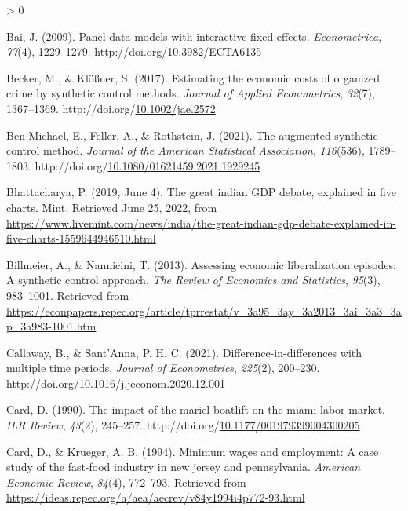 \documentclass[12pt,nobind, a4paper]{reedthesis}
\newlength{\cslhangindent}
\newenvironment{CSLReferences}[2] %
{%
	\setlength{\parindent}{0pt}
	\ifodd #1 \everypar{\setlength{\hangindent}{\cslhangindent}}\ignorespaces\fi
	\ifnum #2 > 0
	\setlength{\parskip}{#2\baselineskip}
	\fi
}%
{}
\begin{document}
\begin{CSLReferences}{1}{0}
 \leavevmode\hypertarget{ref-bai_panel_2009}{}%
 Bai, J. (2009). Panel data models with interactive fixed effects. \emph{Econometrica}, \emph{77}(4), 1229--1279. http://doi.org/\href{https://doi.org/10.3982/ECTA6135}{10.3982/ECTA6135}

 \leavevmode\hypertarget{ref-becker_estimating_2017}{}%
 Becker, M., \& Klößner, S. (2017). Estimating the economic costs of organized crime by synthetic control methods. \emph{Journal of Applied Econometrics}, \emph{32}(7), 1367--1369. http://doi.org/\href{https://doi.org/10.1002/jae.2572}{10.1002/jae.2572}

 \leavevmode\hypertarget{ref-ben-michael_augmented_2021}{}%
 Ben-Michael, E., Feller, A., \& Rothstein, J. (2021). The augmented synthetic control method. \emph{Journal of the American Statistical Association}, \emph{116}(536), 1789--1803. http://doi.org/\href{https://doi.org/10.1080/01621459.2021.1929245}{10.1080/01621459.2021.1929245}

 \leavevmode\hypertarget{ref-bhattacharya_great_2019}{}%
 Bhattacharya, P. (2019, June 4). The great indian {GDP} debate, explained in five charts. Mint. Retrieved June 25, 2022, from \url{https://www.livemint.com/news/india/the-great-indian-gdp-debate-explained-in-five-charts-1559644946510.html}

 \leavevmode\hypertarget{ref-billmeier_assessing_2013}{}%
 Billmeier, A., \& Nannicini, T. (2013). Assessing economic liberalization episodes: A synthetic control approach. \emph{The Review of Economics and Statistics}, \emph{95}(3), 983--1001. Retrieved from \url{https://econpapers.repec.org/article/tprrestat/v_3a95_3ay_3a2013_3ai_3a3_3ap_3a983-1001.htm}

 \leavevmode\hypertarget{ref-callaway_difference_differences_2021}{}%
 Callaway, B., \& Sant'Anna, P. H. C. (2021). Difference-in-differences with multiple time periods. \emph{Journal of Econometrics}, \emph{225}(2), 200--230. http://doi.org/\href{https://doi.org/10.1016/j.jeconom.2020.12.001}{10.1016/j.jeconom.2020.12.001}

 \leavevmode\hypertarget{ref-card_impact_1990}{}%
 Card, D. (1990). The impact of the mariel boatlift on the miami labor market. \emph{{ILR} Review}, \emph{43}(2), 245--257. http://doi.org/\href{https://doi.org/10.1177/001979399004300205}{10.1177/001979399004300205}

 \leavevmode\hypertarget{ref-card_minimum_1994}{}%
 Card, D., \& Krueger, A. B. (1994). Minimum wages and employment: A case study of the fast-food industry in new jersey and pennsylvania. \emph{American Economic Review}, \emph{84}(4), 772--793. Retrieved from \url{https://ideas.repec.org/a/aea/aecrev/v84y1994i4p772-93.html}


\end{CSLReferences}
\end{document}
